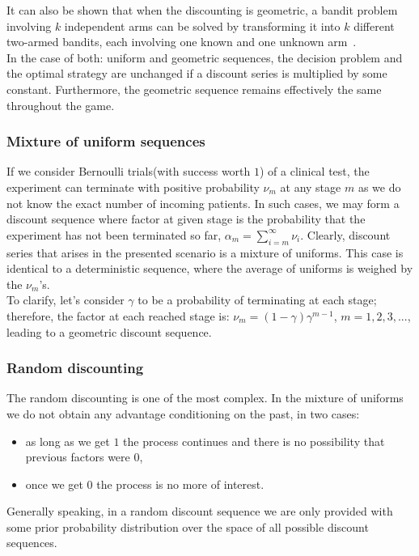 \documentclass[12pt, a4paper, pdflatex, leqno, twoside]{report}
\begin{document}
It can also be shown that when the discounting is geometric, a bandit problem 
involving $k$ independent arms can be solved by transforming it into $k$ different two-armed 
bandits, each involving one known and one unknown arm~\citep{gittins+glazebrook+weber}.\\[1.5cm]



In the case of both: uniform and geometric sequences, the decision problem and the optimal strategy are 
unchanged if a discount series is multiplied by some constant. Furthermore, the 
geometric sequence remains effectively the same throughout the game.


\subsubsection{Mixture of uniform sequences}
If we consider Bernoulli trials(with success worth $1$) of a clinical test, the 
experiment can terminate with positive probability $\nu_m$ at any stage $m$ as 
we do not know the exact number of incoming patients. In such cases, we may form 
a discount sequence where factor at given stage is the probability that the 
experiment has not been terminated so far, $\alpha_m = \sum_{i=m}^\infty 
\nu_i$. Clearly, discount series that arises in the presented scenario is a mixture 
of uniforms. This case is identical to a deterministic sequence, where the average of 
uniforms is weighed by the $\nu_m$'s.\\
To clarify, let's consider $\gamma$ to be a probability of terminating at each stage; therefore, 
the factor at each reached stage is: $\nu_m = (1-\gamma)\gamma^{m-1}$, 
$m=1,2,3,...$, leading to a geometric discount sequence.

\subsubsection{Random discounting}
The random discounting is one of the most complex. 
In the mixture of uniforms we do not obtain any advantage conditioning on the past, in two cases:
\begin{itemize}
\item as long as we get $1$ the process continues and there is no possibility that previous factors were $0$,
\item once we get $0$ the process is no more of interest. 
\end{itemize}
Generally speaking, in a random discount sequence we 
are only provided with some prior probability distribution over the space of all 
possible discount sequences.\\
\end{document}
